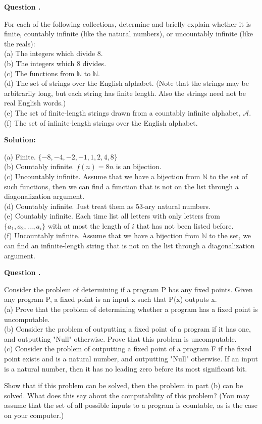 \documentclass[12pt]{article}
\newcounter{questionnumber}
\newenvironment{question}[1][]{\stepcounter{questionnumber}\par\noindent\textbf{Question \thequestionnumber. #1}\par}{\par}
\newenvironment{solution}{\par\noindent\textbf{Solution:}\par}{\par\vspace{1em}}
\begin{document}
\begin{question}
    For each of the following collections, determine and briefly explain whether it is finite, countably infinite (like the natural numbers), or uncountably infinite (like the reals):\\
    (a) The integers which divide 8.\\
    (b) The integers which 8 divides.\\
    (c) The functions from $\mathbb{N}$ to $\mathbb{N}$.\\
    (d) The set of strings over the English alphabet. (Note that the strings may be arbitrarily long, but each string has finite length. Also the strings need not be real English words.)\\
    (e) The set of finite-length strings drawn from a countably infinite alphabet, $\mathscr{A}$.\\
    (f) The set of infinite-length strings over the English alphabet.
\end{question}
\begin{solution}
    \noindent
    (a) Finite. $\{-8,-4,-2,-1,1,2,4,8\}$\\
    (b) Countably infinite. $f(n)=8n$ is an bijection.\\
    (c) Uncountably infinite. Assume that we have a bijection from $\mathbb{N}$ to the set of such functions, then we can find a function that is not on the list through a diagonalization argument.\\
    (d) Countably infinite. Just treat them as 53-ary natural numbers.\\
    (e) Countably infinite. Each time list all letters with only letters from $\{a_1,a_2,\dots,a_i\}$ with at most the length of $i$ that has not been listed before.\\
    (f) Uncountably infinite. Assume that we have a bijection from $\mathbb{N}$ to the set, we can find an infinite-length string that is not on the list through a diagonalization argument.\\
\end{solution}
\begin{question}
    Consider the problem of determining if a program P has any fixed points. Given any program P, a fixed point is an input x such that P(x) outputs x.\\
    (a) Prove that the problem of determining whether a program has a fixed point is uncomputable.\\
    (b) Consider the problem of outputting a fixed point of a program if it has one, and outputting "Null" otherwise. Prove that this problem is uncomputable.\\
    (c) Consider the problem of outputting a fixed point of a program F if the fixed point exists and is a natural number, and outputting "Null" otherwise. If an input is a natural number, then it has no leading zero before its most significant bit.

    Show that if this problem can be solved, then the problem in part (b) can be solved. What does this say about the computability of this problem? (You may assume that the set of all possible inputs to a program is countable, as is the case on your computer.)
\end{question}
\end{document}
